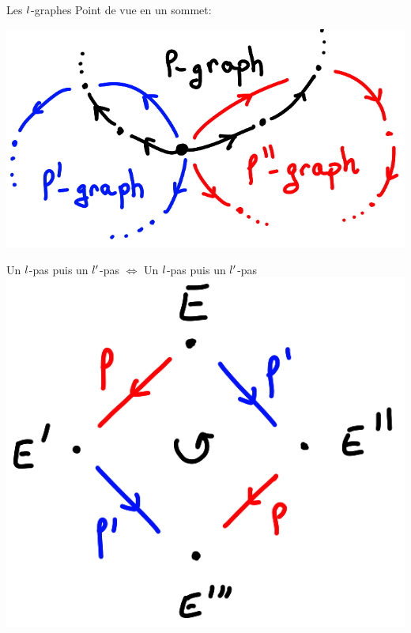 \documentclass{beamer}
\begin{document}
\begin{frame}{Les $\mathnormal{l}$-graphes}
	Point de vue en un sommet:
	\begin{center}
		\includegraphics[scale=0.2]{../figs/graphs}
	\end{center}
	\begin{center}
	Un $\mathnormal{l}$-pas puis un $\mathnormal{l}'$-pas $\iff$ Un $\mathnormal{l}$-pas puis un $\mathnormal{l}'$-pas
		\includegraphics[scale=0.2]{../figs/comm}
	\end{center}
\end{frame}
\end{document}
